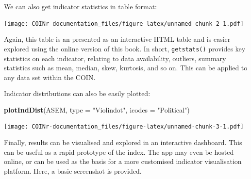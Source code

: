 \documentclass[
]{book}
\newenvironment{Shaded}{\begin{snugshade}}{\end{snugshade}}
\newcommand{\DataTypeTok}[1]{\textcolor[rgb]{0.13,0.29,0.53}{#1}}
\newcommand{\DecValTok}[1]{\textcolor[rgb]{0.00,0.00,0.81}{#1}}
\newcommand{\KeywordTok}[1]{\textcolor[rgb]{0.13,0.29,0.53}{\textbf{#1}}}
\newcommand{\NormalTok}[1]{#1}
\newcommand{\OperatorTok}[1]{\textcolor[rgb]{0.81,0.36,0.00}{\textbf{#1}}}
\newcommand{\OtherTok}[1]{\textcolor[rgb]{0.56,0.35,0.01}{#1}}
\newcommand{\StringTok}[1]{\textcolor[rgb]{0.31,0.60,0.02}{#1}}
\begin{document}
We can also get indicator statistics in table format:

\begin{Shaded}
\end{Shaded}

\texttt{[image: COINr-documentation\_files/figure-latex/unnamed-chunk-2-1.pdf]}

Again, this table is an presented as an interactive HTML table and is easier explored using the online version of this book. In short, \texttt{getstats()} provides key statistics on each indicator, relating to data availability, outliers, summary statistics such as mean, median, skew, kurtosis, and so on. This can be applied to any data set within the COIN.

Indicator distributions can also be easily plotted:

\begin{Shaded}
\begin{Highlighting}[]
\KeywordTok{plotIndDist}\NormalTok{(ASEM, }\DataTypeTok{type =} \StringTok{"Violindot"}\NormalTok{, }\DataTypeTok{icodes =} \StringTok{"Political"}\NormalTok{)}
\end{Highlighting}
\end{Shaded}

\texttt{[image: COINr-documentation\_files/figure-latex/unnamed-chunk-3-1.pdf]}

Finally, results can be visualised and explored in an interactive dashboard. This can be useful as a rapid prototype of the index. The app may even be hosted online, or can be used as the basis for a more customised indicator visualisation platform. Here, a basic screenshot is provided.
\end{document}
